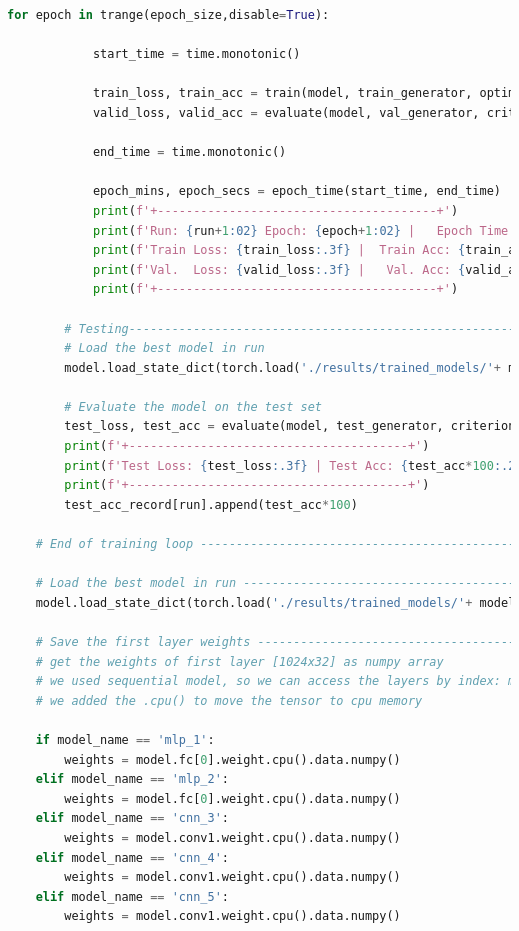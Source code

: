 \documentclass[3p,times,procedia]{elsarticle}
\begin{document}
\begin{lstlisting}[language=Python]
        for epoch in trange(epoch_size,disable=True):
    
            start_time = time.monotonic()
    
            train_loss, train_acc = train(model, train_generator, optimizer, criterion, device)
            valid_loss, valid_acc = evaluate(model, val_generator, criterion, device, sv=0)
    
            end_time = time.monotonic()
    
            epoch_mins, epoch_secs = epoch_time(start_time, end_time)
            print(f'+---------------------------------------+')
            print(f'Run: {run+1:02} Epoch: {epoch+1:02} |   Epoch Time: {epoch_mins}m {epoch_secs}s')
            print(f'Train Loss: {train_loss:.3f} |  Train Acc: {train_acc*100:.2f} %')
            print(f'Val.  Loss: {valid_loss:.3f} |   Val. Acc: {valid_acc*100:.2f} %')
            print(f'+---------------------------------------+')
        
        # Testing----------------------------------------------------------------------------------#
        # Load the best model in run
        model.load_state_dict(torch.load('./results/trained_models/'+ model_name+'[' +str(run)+'].pt'))
    
        # Evaluate the model on the test set
        test_loss, test_acc = evaluate(model, test_generator, criterion, device, sv=0)
        print(f'+---------------------------------------+')
        print(f'Test Loss: {test_loss:.3f} | Test Acc: {test_acc*100:.2f}%')
        print(f'+---------------------------------------+')
        test_acc_record[run].append(test_acc*100)
    
    # End of training loop --------------------------------------------------------------#
    
    # Load the best model in run --------------------------------------------------------#
    model.load_state_dict(torch.load('./results/trained_models/'+ model_name+'[' +str(np.array(test_acc_record).argmax())+'].pt'))
    
    # Save the first layer weights -------------------------------------------------------#
    # get the weights of first layer [1024x32] as numpy array
    # we used sequential model, so we can access the layers by index: model_mlp.fc[0].weight.data.numpy()
    # we added the .cpu() to move the tensor to cpu memory
    
    if model_name == 'mlp_1':
        weights = model.fc[0].weight.cpu().data.numpy()
    elif model_name == 'mlp_2':
        weights = model.fc[0].weight.cpu().data.numpy()
    elif model_name == 'cnn_3':
        weights = model.conv1.weight.cpu().data.numpy()
    elif model_name == 'cnn_4':
        weights = model.conv1.weight.cpu().data.numpy()
    elif model_name == 'cnn_5':
        weights = model.conv1.weight.cpu().data.numpy()
    

\end{lstlisting}
\end{document}
